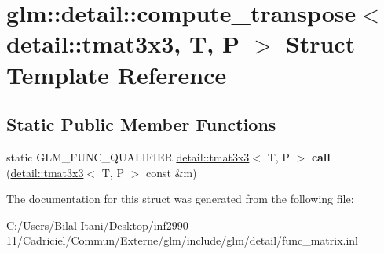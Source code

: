\hypertarget{structglm_1_1detail_1_1compute__transpose_3_01detail_1_1tmat3x3_00_01_t_00_01_p_01_4}{}\section{glm\+:\+:detail\+:\+:compute\+\_\+transpose$<$ detail\+:\+:tmat3x3, T, P $>$ Struct Template Reference}
\label{structglm_1_1detail_1_1compute__transpose_3_01detail_1_1tmat3x3_00_01_t_00_01_p_01_4}
\subsection*{Static Public Member Functions}
\begin{DoxyCompactItemize}
\item 
static G\+L\+M\+\_\+\+F\+U\+N\+C\+\_\+\+Q\+U\+A\+L\+I\+F\+I\+ER \hyperlink{structglm_1_1detail_1_1tmat3x3}{detail\+::tmat3x3}$<$ T, P $>$ {\bfseries call} (\hyperlink{structglm_1_1detail_1_1tmat3x3}{detail\+::tmat3x3}$<$ T, P $>$ const \&m)\hypertarget{structglm_1_1detail_1_1compute__transpose_3_01detail_1_1tmat3x3_00_01_t_00_01_p_01_4_aeb6e3f561dc927d220808c5267b65149}{}\label{structglm_1_1detail_1_1compute__transpose_3_01detail_1_1tmat3x3_00_01_t_00_01_p_01_4_aeb6e3f561dc927d220808c5267b65149}

\end{DoxyCompactItemize}


The documentation for this struct was generated from the following file\+:\begin{DoxyCompactItemize}
\item 
C\+:/\+Users/\+Bilal Itani/\+Desktop/inf2990-\/11/\+Cadriciel/\+Commun/\+Externe/glm/include/glm/detail/func\+\_\+matrix.\+inl\end{DoxyCompactItemize}
